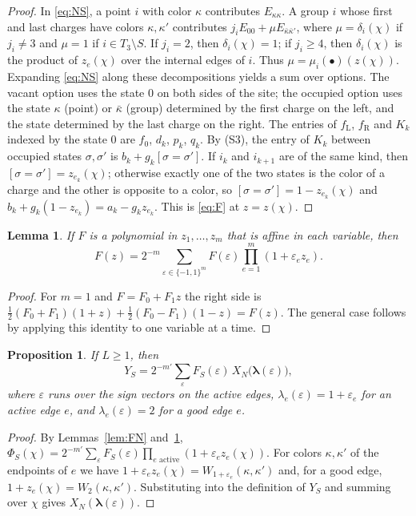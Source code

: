 \documentclass{amsart}
\newtheorem{proposition}[theorem]{Proposition}
\newtheorem{lemma}[theorem]{Lemma}
\theoremstyle{definition}
\theoremstyle{remark}
\numberwithin{equation}{section}
\newcommand{\bs}{\bar{\kappa}}
\newcommand{\occ}{\bullet}
\begin{document}
\begin{proof}
In \eqref{eq:NS}, a point $i$ with color $\kappa$ contributes $E_{\kappa\kappa}$. A group $i$ whose first and last charges have colors $\kappa,\kappa'$ contributes $j_iE_{00}+\mu E_{\bs\bar\kappa'}$, where $\mu=\delta_i(\chi)$ if $j_i\ne3$ and $\mu=1$ if $i\in T_3\setminus S$. If $j_i=2$, then $\delta_i(\chi)=1$; if $j_i\ge4$, then $\delta_i(\chi)$ is the product of $z_e(\chi)$ over the internal edges of $i$. Thus $\mu=\mu_i(\occ)(z(\chi))$. Expanding \eqref{eq:NS} along these decompositions yields a sum over options. The vacant option uses the state $0$ on both sides of the site; the occupied option uses the state $\kappa$ (point) or $\bs$ (group) determined by the first charge on the left, and the state determined by the last charge on the right. The entries of $f_{\mathrm L}$, $f_{\mathrm R}$ and $K_k$ indexed by the state $0$ are $f_0$, $d_k$, $p_k$, $q_k$. By (S3), the entry of $K_k$ between occupied states $\sigma,\sigma'$ is $b_k+g_k[\sigma=\sigma']$. If $i_k$ and $i_{k+1}$ are of the same kind, then $[\sigma=\sigma']=z_{e_k}(\chi)$; otherwise exactly one of the two states is the color of a charge and the other is opposite to a color, so $[\sigma=\sigma']=1-z_{e_k}(\chi)$ and $b_k+g_k(1-z_{e_k})=a_k-g_kz_{e_k}$. This is \eqref{eq:F} at $z=z(\chi)$.
\end{proof}

\begin{lemma}\label{lem:signid}
If $F$ is a polynomial in $z_1,\dots,z_m$ that is affine in each variable, then
\[
F(z)=2^{-m}\sum_{\varepsilon\in\{-1,1\}^m}F(\varepsilon)\prod_{e=1}^m(1+\varepsilon_ez_e).
\]
\end{lemma}

\begin{proof}
For $m=1$ and $F=F_0+F_1z$ the right side is $\frac12(F_0+F_1)(1+z)+\frac12(F_0-F_1)(1-z)=F(z)$. The general case follows by applying this identity to one variable at a time.
\end{proof}

\begin{proposition}\label{prop:ising}
If $L\ge1$, then
\[
Y_S=2^{-m'}\sum_{\varepsilon}F_S(\varepsilon)\,X_N\bigl(\boldsymbol\lambda(\varepsilon)\bigr),
\]
where $\varepsilon$ runs over the sign vectors on the active edges, $\lambda_e(\varepsilon)=1+\varepsilon_e$ for an active edge $e$, and $\lambda_e(\varepsilon)=2$ for a good edge $e$.
\end{proposition}

\begin{proof}
By Lemmas~\ref{lem:FN} and~\ref{lem:signid}, $\Phi_S(\chi)=2^{-m'}\sum_\varepsilon F_S(\varepsilon)\prod_{e\text{ active}}(1+\varepsilon_ez_e(\chi))$. For colors $\kappa,\kappa'$ of the endpoints of $e$ we have $1+\varepsilon_ez_e(\chi)=W_{1+\varepsilon_e}(\kappa,\kappa')$ and, for a good edge, $1+z_e(\chi)=W_2(\kappa,\kappa')$. Substituting into the definition of $Y_S$ and summing over $\chi$ gives $X_N(\boldsymbol\lambda(\varepsilon))$.
\end{proof}
\end{document}
